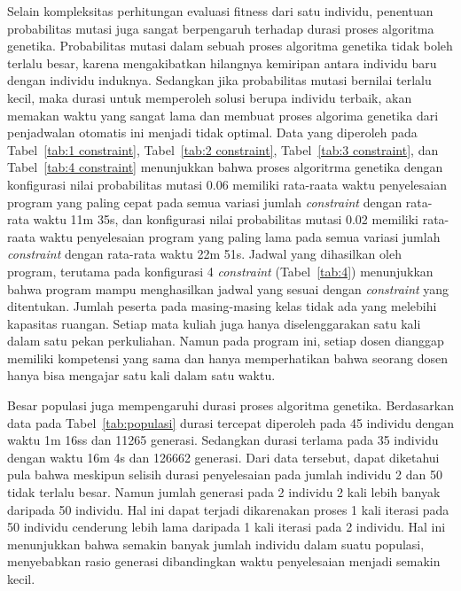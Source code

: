 Selain kompleksitas perhitungan evaluasi fitness dari satu individu, penentuan probabilitas mutasi juga sangat berpengaruh terhadap durasi proses algoritma genetika. 
Probabilitas mutasi dalam sebuah proses algoritma genetika tidak boleh terlalu besar, karena mengakibatkan hilangnya kemiripan antara individu baru dengan individu induknya. 
Sedangkan jika probabilitas mutasi bernilai terlalu kecil, maka durasi untuk memperoleh solusi berupa individu terbaik, akan memakan waktu yang sangat lama dan membuat proses algorima genetika dari penjadwalan otomatis ini menjadi tidak optimal.
Data yang diperoleh pada Tabel~\ref{tab:1 constraint}, Tabel~\ref{tab:2 constraint}, Tabel~\ref{tab:3 constraint}, dan Tabel~\ref{tab:4 constraint} menunjukkan bahwa proses algoritrma genetika dengan konfigurasi nilai probabilitas mutasi 0.06 memiliki rata-raata waktu penyelesaian program yang paling cepat pada semua variasi jumlah \textit{constraint} dengan rata-rata waktu 11m 35s, 
dan konfigurasi nilai probabilitas mutasi 0.02 memiliki rata-raata waktu penyelesaian program yang paling lama pada semua variasi jumlah \textit{constraint} dengan rata-rata waktu 22m 51s. 
Jadwal yang dihasilkan oleh program, terutama pada konfigurasi 4 \textit{constraint} (Tabel~\ref{tab:4}) menunjukkan bahwa program mampu menghasilkan jadwal yang sesuai dengan \textit{constraint} yang ditentukan. 
Jumlah peserta pada masing-masing kelas tidak ada yang melebihi kapasitas ruangan. 
Setiap mata kuliah juga hanya diselenggarakan satu kali dalam satu pekan perkuliahan.
Namun pada program ini, setiap dosen dianggap memiliki kompetensi yang sama dan hanya memperhatikan bahwa seorang dosen hanya bisa mengajar satu kali dalam satu waktu. 

Besar populasi juga mempengaruhi durasi proses algoritma genetika. 
Berdasarkan data pada Tabel~\ref{tab:populasi} durasi tercepat diperoleh pada 45 individu dengan waktu 1m 16ss dan 11265 generasi.
Sedangkan durasi terlama pada 35 individu dengan waktu 16m 4s dan 126662 generasi.
Dari data tersebut, dapat diketahui pula bahwa meskipun selisih durasi penyelesaian pada jumlah individu 2 dan 50 tidak terlalu besar.
Namun jumlah generasi pada 2 individu 2 kali lebih banyak daripada 50 individu. 
Hal ini dapat terjadi dikarenakan proses 1 kali iterasi pada 50 individu cenderung lebih lama daripada 1 kali iterasi pada 2 individu.
Hal ini menunjukkan bahwa semakin banyak jumlah individu dalam suatu populasi, menyebabkan rasio generasi dibandingkan waktu penyelesaian menjadi semakin kecil.

